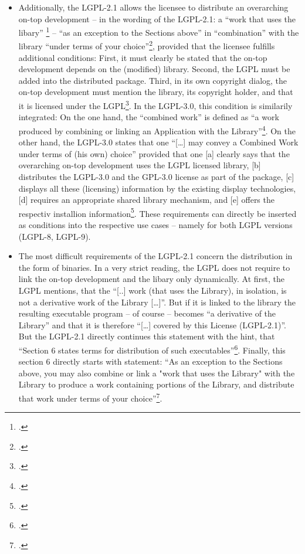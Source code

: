 \begin{itemize}
  \item Additionally, the LGPL-2.1 allows the licensee to distribute an
  overarching on-top development -- in the wording of the LGPL-2.1: a
  \enquote{work that uses the libary} \footcite[cf.][\nopage wp.\ §5,
  §6]{Lgpl21OsiLicense1999a} -- \enquote{as an exception to the Sections above}
  in \enquote{combination} with the library \enquote{under terms of your
  choice}\footcite[cf.][\nopage wp.\ §6]{Lgpl21OsiLicense1999a}, provided that
  the licensee fulfills additional conditions:  First, it must clearly be stated
  that the on-top development depends on the (modified) library. Second, the
  LGPL must be added into the distributed package. Third, in its own copyright
  dialog, the on-top development must mention the library, its copyright holder,
  and that it is licensed under the LGPL\footcite[cf.][\nopage wp.\
  §6]{Lgpl21OsiLicense1999a}. In the LGPL-3.0, this condition is similarily
  integrated: On the one hand, the \enquote{combined work} is defined as
  \enquote{a work produced by combining or linking an Application with the
  Library}\footcite[cf.][\nopage wp.\ §0]{Lgpl30OsiLicense2007a}. On the other
  hand, the LGPL-3.0 states that one \enquote{[\ldots] may convey a Combined
  Work under terms of (his own) choice} provided that one [a] clearly says that
  the overarching on-top development uses the LGPL licensed library, [b]
  distributes the LGPL-3.0 and the GPL-3.0 license as part of the package, [c]
  displays all these (licensing) information by the existing display
  technologies, [d] requires an appropriate shared library mechanism, and [e]
  offers the respectiv installion information\footcite[cf.][\nopage wp.\
  §4]{Lgpl30OsiLicense2007a}. These requirements can directly be inserted as
  conditions into the respective use cases -- namely for both LGPL versions
  (LGPL-8, LGPL-9).
  
  \item The most difficult requirements of the LGPL-2.1 concern the distribution
  in the form of binaries. In a very strict reading, the LGPL does not require
  to link the on-top development and the libary only dynamically. At first, the
  LGPL mentions, that the \enquote{[..] work (that uses the Library), in
  isolation, is not a derivative work of the Library [\ldots]}. But if it is
  linked to the library the resulting executable program -- of course -- becomes
  \enquote{a derivative of the Library} and that it is therefore
  \enquote{[\ldots] covered by this License (LGPL-2.1)}. But the LGPL-2.1
  directly continues this statement with the hint, that \enquote{Section 6
  states terms for distribution of such executables}\footcite[cf.][\nopage wp.\
  §5]{Lgpl21OsiLicense1999a}. Finally, this section 6 directly starts with
  statement: \enquote{As an exception to the Sections above, you may also
  combine or link a "work that uses the Library" with the Library to produce a
  work containing portions of the Library, and distribute that work under terms
  of your choice}\footcite[cf.][\nopage wp.\ §6]{Lgpl21OsiLicense1999a}.
  

\end{itemize}
